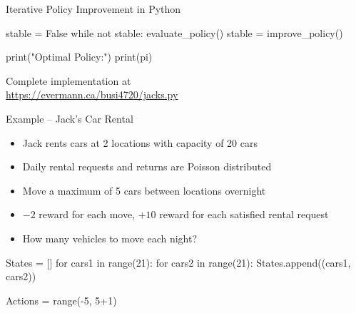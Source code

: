 \documentclass[ignorenonframetext,xcolor=x11names]{beamer}
\begin{document}
\begin{frame}[fragile]{Iterative Policy Improvement in Python}
\begin{pythoncode}
stable = False
while not stable:
    evaluate_policy()
    stable = improve_policy()

print("Optimal Policy:")
print(pi)
\end{pythoncode}
\begin{center}
Complete implementation at \\
\vspace{\baselineskip}
\url{https://evermann.ca/busi4720/jacks.py}
\end{center}
\end{frame}

\begin{frame}[fragile]{Example -- Jack's Car Rental}
\begin{itemize}
   \item Jack rents cars at 2 locations with capacity of 20 cars
   \item Daily rental requests and returns are Poisson distributed
   \item Move a maximum of 5 cars between locations overnight
   \item $-2$ reward for each move, $+10$ reward for each satisfied rental request
   \item How many vehicles to move each night?
\end{itemize}
\begin{pythoncode}
States = []
for cars1 in range(21):
    for cars2 in range(21):
        States.append((cars1, cars2))
        
Actions = range(-5, 5+1)
\end{pythoncode}
\end{frame}
\end{document}
